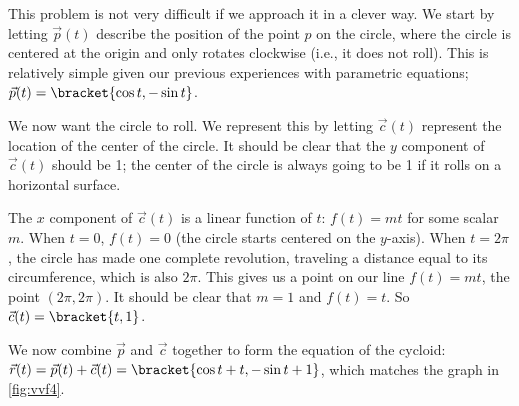 {This problem is not very difficult if we approach it in a clever way. We start by letting $\vec p(t)$ describe the position of the point $p$ on the circle, where the circle is centered at the origin and only rotates clockwise (i.e., it  does not roll). This is relatively simple given our previous experiences with parametric equations; $\vec p(t) =\bracket{\cos t, -\sin t}$. 

We now want the circle to roll. We represent this by letting $\vec c(t)$ represent the location of the center of the circle. It should be clear that the $y$ component of $\vec c(t)$ should be 1; the center of the circle is always going to be 1 if it rolls on a horizontal surface.


The $x$ component of $\vec c(t)$ is a linear function of $t$: $f(t) = mt$ for some scalar $m$. When $t=0$, $f(t) = 0$ (the circle starts centered on the $y$-axis). When $t=2\pi$, the circle has made one complete revolution, traveling a distance equal to its circumference, which is also $2\pi$. This gives us a point on our line $f(t) = mt$, the point $(2\pi, 2\pi)$. It should be clear that $m=1$ and $f(t) = t$. So $\vec c(t) =\bracket{t, 1}$. 

We now combine $\vec p$ and $\vec c$ together to form the equation of the cycloid: $\vec r(t) = \vec p(t) + \vec c(t) =\bracket{\cos t+ t,-\sin t+1}$, which
matches the graph in \autoref{fig:vvf4}.
}

